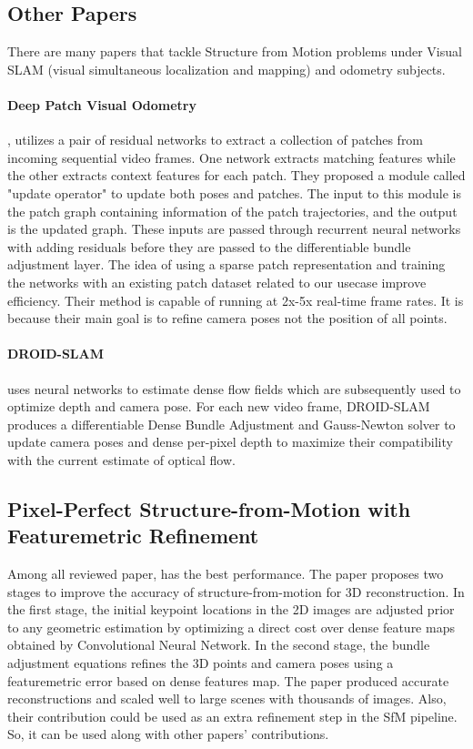 \documentclass[11pt]{article}
\begin{document}
    \subsection{Other Papers}
    There are many papers that tackle Structure from Motion problems under Visual SLAM (visual simultaneous
    localization and mapping) and odometry subjects.

    \paragraph{Deep Patch Visual Odometry} \cite{teed2022deep}, utilizes a pair of residual networks to extract
    a collection of patches from incoming sequential video frames. One network extracts matching features while
    the other extracts context features for each patch. They proposed a module called "update operator" to update both
    poses and patches. The input to this module is the patch graph containing information of the patch trajectories,
    and the output is the updated graph. These inputs are passed through recurrent neural networks with adding residuals
    before they are passed to the differentiable bundle adjustment layer.
    The idea of using a sparse patch representation and training the networks with an existing patch dataset related
    to our usecase improve efficiency. Their method is capable of running at 2x-5x real-time frame rates. It is because
    their main goal is to refine camera poses not the position of all points.

    \paragraph{DROID-SLAM} \cite{teed2022droidslam} uses neural networks to estimate dense flow fields which are subsequently
    used to optimize depth and camera pose. For each new video frame, DROID-SLAM produces a differentiable Dense
    Bundle Adjustment and Gauss-Newton solver to update camera poses and dense per-pixel depth to maximize their
    compatibility with the current estimate of optical flow.


    \newpage
    \subsection{Pixel-Perfect Structure-from-Motion with Featuremetric Refinement}
    Among all reviewed paper, \cite{lindenberger2021pixsfm} has the best performance. The paper
    proposes two stages to improve the accuracy of structure-from-motion for 3D reconstruction.
    In the first stage, the initial keypoint locations in the 2D images are adjusted prior to any geometric estimation
    by optimizing a direct cost over dense feature maps obtained by Convolutional Neural Network.
    In the second stage, the bundle adjustment equations refines the 3D points and camera poses using
    a featuremetric error based on dense features map.
    The paper produced accurate reconstructions and scaled well to large scenes with thousands of images.
    Also, their contribution could be used as an extra refinement step in the SfM pipeline. So, it can be used
    along with other papers' contributions.
\end{document}
